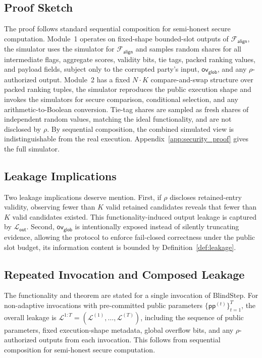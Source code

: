 \documentclass[conference,compsoc,letterpaper]{IEEEtran}
\theoremstyle{definition}
\theoremstyle{remark}
\newcommand{\BlindStep}{BlindStep\xspace}
\newcommand{\Leak}{\mathcal{L}}
\newcommand{\LeakOut}{\Leak_{\mathsf{out}}}
\newcommand{\Falign}{\mathcal{F}_{\mathsf{align}}}
\newcommand{\pp}{\mathsf{pp}}
\newcommand{\policy}{\rho}
\newcommand{\globaloverflow}{\mathsf{ov}_{\mathsf{glob}}}
\begin{document}
\subsection{Proof Sketch}
\label{subsec:proof}

The proof follows standard sequential composition for semi-honest secure computation.
Module~1 operates on fixed-shape bounded-slot outputs of $\Falign{}$, the simulator uses the simulator for $\Falign{}$ and samples random shares for all intermediate flags, aggregate scores, validity bits, tie tags, packed ranking values, and payload fields, subject only to the corrupted party's input, $\globaloverflow$, and any $\policy$-authorized output.
Module~2 has a fixed $N\cdot K$ compare-and-swap structure over packed ranking tuples, the simulator reproduces the public execution shape and invokes the simulators for secure comparison, conditional selection, and any arithmetic-to-Boolean conversion.
Tie-tag shares are sampled as fresh shares of independent random values, matching the ideal functionality, and are not disclosed by $\policy$.
By sequential composition, the combined simulated view is indistinguishable from the real execution.
Appendix~\ref{app:security_proof} gives the full simulator.

\subsection{Leakage Implications}
\label{subsec:leakage_discussion}

Two leakage implications deserve mention.
First, if $\policy$ discloses retained-entry validity, observing fewer than $K$ valid retained candidates reveals that fewer than $K$ valid candidates existed.
This functionality-induced output leakage is captured by $\LeakOut$.
Second, $\globaloverflow$ is intentionally exposed instead of silently truncating evidence, allowing the protocol to enforce fail-closed correctness under the public slot budget, its information content is bounded by Definition~\ref{def:leakage}.

\subsection{Repeated Invocation and Composed Leakage}
\label{subsec:repeated_invocation}

The functionality and theorem are stated for a single invocation of \BlindStep{}.
For non-adaptive invocations with pre-committed public parameters $\{\pp^{(t)}\}_{t=1}^{T}$, the overall leakage is $\Leak^{1:T}=(\Leak^{(1)},\ldots,\Leak^{(T)})$, including the sequence of public parameters, fixed execution-shape metadata, global overflow bits, and any $\policy$-authorized outputs from each invocation.
This follows from sequential composition for semi-honest secure computation.
\end{document}
